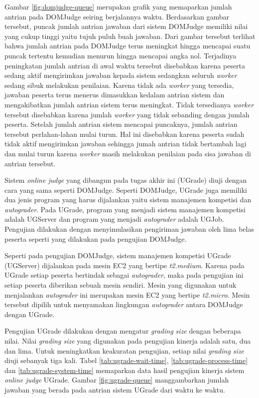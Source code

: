 \par Gambar \ref{fig:domjudge-queue} merupakan grafik yang memaparkan jumlah antrian pada DOMJudge seiring berjalannya waktu. Berdasarkan gambar tersebut, puncak jumlah antrian jawaban dari sistem DOMJudge memiliki nilai yang cukup tinggi yaitu tujuh puluh buah jawaban. Dari gambar tersebut terlihat bahwa jumlah antrian pada DOMJudge terus meningkat hingga mencapai suatu puncak tertentu kemudian menurun hingga mencapai angka nol. Terjadinya peningkatan jumlah antrian di awal waktu tersebut disebabkan karena peserta sedang aktif mengirimkan jawaban kepada sistem sedangkan seluruh \textit{worker} sedang sibuk melakukan penilaian. Karena tidak ada \textit{worker} yang tersedia, jawaban peserta terus menerus dimasukkan kedalam antrian sistem dan mengakibatkan jumlah antrian sistem terus meningkat. Tidak tersedianya \textit{worker} tersebut disebabkan karena jumlah \textit{worker} yang tidak sebanding dengan jumlah peserta. Setelah jumlah antrian sistem mencapai puncaknya, jumlah antrian tersebut perlahan-lahan mulai turun. Hal ini disebabkan karena peserta sudah tidak aktif mengirimkan jawaban sehingga jumah antrian tidak bertambah lagi dan mulai turun karena \textit{worker} masih melakukan penilaian pada sisa jawaban di antrian tersebut.  

\par Sistem \textit{online judge} yang dibangun pada tugas akhir ini (UGrade) diuji dengan cara yang sama seperti DOMJudge. Seperti DOMJudge, UGrade juga memiliki dua jenis program yang harus dijalankan yaitu sistem manajemen kompetisi dan \textit{autograder}. Pada UGrade, program yang menjadi sistem manajemen kompetisi adalah UGServer dan program yang menjadi \textit{autograder} adalah UGJob. Pengujian dilakukan dengan menyimulasikan pengiriman jawaban oleh lima belas peserta seperti yang dilakukan pada pengujian DOMJudge.

\par Seperti pada pengujian DOMJudge, sistem manajemen kompetisi UGrade (UGServer) dijalankan pada mesin EC2 yang bertipe \textit{t2.medium}. Karena pada UGrade setiap peserta bertindak sebagai \textit{autograder}, maka pada pengujian ini setiap peserta diberikan sebuah mesin sendiri. Mesin yang digunakan untuk menjalankan \textit{autograder} ini merupakan mesin EC2 yang bertipe \textit{t2.micro}. Mesin tersebut dipilih untuk menyamakan lingkungan \textit{autograder} antara DOMJudge dengan UGrade.

\par Pengujian UGrade dilakukan dengan mengatur \textit{grading size} dengan beberapa nilai. Nilai \textit{grading size} yang digunakan pada pengujian kinerja adalah satu, dua dan lima. Untuk meningkatkan keakuratan pengujian, setiap nilai \textit{grading size} diuji sebanyak tiga kali. Tabel \ref{tab:ugrade-wait-time}, \ref{tab:ugrade-process-time} dan \ref{tab:ugrade-system-time} memaparkan data hasil pengujian kinerja sistem \textit{online judge} UGrade. Gambar \ref{fig:ugrade-queue} manggambarkan jumlah jawaban yang berada pada antrian sistem UGrade dari waktu ke waktu.

